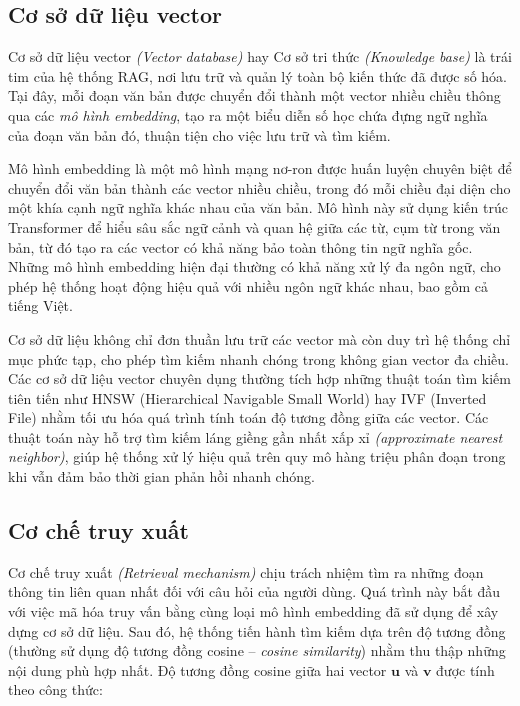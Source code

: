 \subsection{Cơ sở dữ liệu vector}

{Cơ sở dữ liệu vector} \emph{(Vector database)} hay {Cơ sở tri thức} \emph{(Knowledge base)} là trái tim của hệ thống RAG, nơi lưu trữ và quản lý toàn bộ kiến thức đã được số hóa. Tại đây, mỗi đoạn văn bản được chuyển đổi thành một vector nhiều chiều thông qua các \emph{mô hình embedding}, tạo ra một biểu diễn số học chứa đựng ngữ nghĩa của đoạn văn bản đó, thuận tiện cho việc lưu trữ và tìm kiếm.

Mô hình embedding là một mô hình mạng nơ-ron được huấn luyện chuyên biệt để chuyển đổi văn bản thành các vector nhiều chiều, trong đó mỗi chiều đại diện cho một khía cạnh ngữ nghĩa khác nhau của văn bản. Mô hình này sử dụng kiến trúc Transformer để hiểu sâu sắc ngữ cảnh và quan hệ giữa các từ, cụm từ trong văn bản, từ đó tạo ra các vector có khả năng bảo toàn thông tin ngữ nghĩa gốc. Những mô hình embedding hiện đại thường có khả năng xử lý đa ngôn ngữ, cho phép hệ thống hoạt động hiệu quả với nhiều ngôn ngữ khác nhau, bao gồm cả tiếng Việt.

Cơ sở dữ liệu không chỉ đơn thuần lưu trữ các vector mà còn duy trì hệ thống chỉ mục phức tạp, cho phép tìm kiếm nhanh chóng trong không gian vector đa chiều. Các cơ sở dữ liệu vector chuyên dụng thường tích hợp những thuật toán tìm kiếm tiên tiến như HNSW {(Hierarchical Navigable Small World)} hay IVF {(Inverted File)} nhằm tối ưu hóa quá trình tính toán độ tương đồng giữa các vector. Các thuật toán này hỗ trợ tìm kiếm láng giềng gần nhất xấp xỉ \emph{(approximate nearest neighbor)}, giúp hệ thống xử lý hiệu quả trên quy mô hàng triệu phân đoạn trong khi vẫn đảm bảo thời gian phản hồi nhanh chóng.

\subsection{Cơ chế truy xuất}

{Cơ chế truy xuất} \emph{(Retrieval mechanism)} chịu trách nhiệm tìm ra những đoạn thông tin liên quan nhất đối với câu hỏi của người dùng. Quá trình này bắt đầu với việc mã hóa truy vấn bằng cùng loại mô hình embedding đã sử dụng để xây dựng cơ sở dữ liệu. Sau đó, hệ thống tiến hành tìm kiếm dựa trên độ tương đồng (thường sử dụng {độ tương đồng cosine} -- \emph{cosine similarity}) nhằm thu thập những nội dung phù hợp nhất. Độ tương đồng cosine giữa hai vector \(\mathbf{u}\) và \(\mathbf{v}\) được tính theo công thức:

